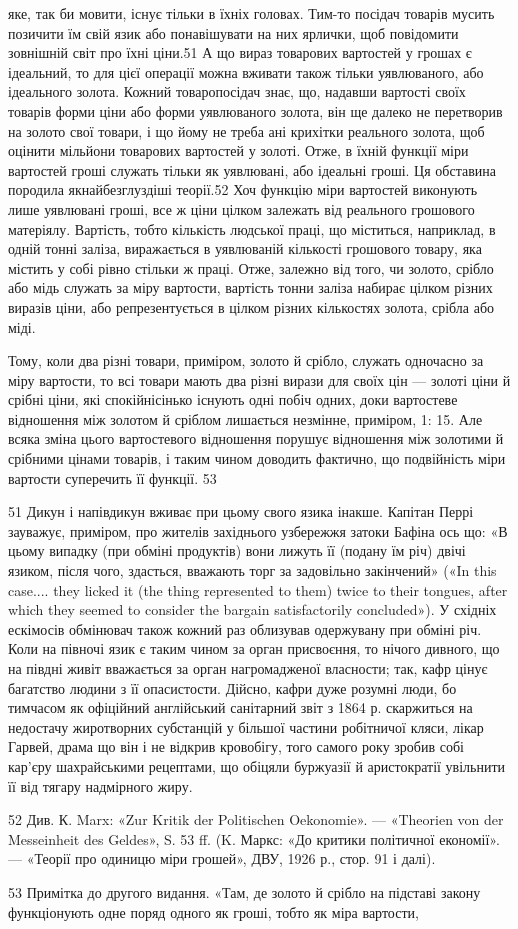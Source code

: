 яке, так би мовити, існує тільки в їхніх головах. Тим-то посідач
товарів мусить позичити їм свій язик або понавішувати на них
ярлички, щоб повідомити зовнішній світ про їхні ціни.51 А що
вираз товарових вартостей у грошах є ідеальний, то для цієї
операції можна вживати також тільки уявлюваного, або ідеального
золота. Кожний товаропосідач знає, що, надавши вартості
своїх товарів форми ціни або форми уявлюваного золота, він
ще далеко не перетворив на золото свої товари, і що йому не
треба ані крихітки реального золота, щоб оцінити мільйони
товарових вартостей у золоті. Отже, в їхній функції міри вартостей
гроші служать тільки як уявлювані, або ідеальні гроші.
Ця обставина породила якнайбезглуздіші теорії.52 Хоч функцію
міри вартостей виконують лише уявлювані гроші, все ж ціни
цілком залежать від реального грошового матеріялу. Вартість,
тобто кількість людської праці, що міститься, наприклад, в
одній тонні заліза, виражається в уявлюваній кількості грошового
товару, яка містить у собі рівно стільки ж праці. Отже,
залежно від того, чи золото, срібло або мідь служать за міру
вартости, вартість тонни заліза набирає цілком різних виразів
ціни, або репрезентується в цілком різних кількостях золота,
срібла або міді.

Тому, коли два різні товари, приміром, золото й срібло,
служать одночасно за міру вартости, то всі товари мають два
різні вирази для своїх цін — золоті ціни й срібні ціни, які спокійнісінько
існують одні побіч одних, доки вартостеве відношення
між золотом й сріблом лишається незмінне, приміром,
1: 15. Але всяка зміна цього вартостевого відношення порушує
відношення між золотими й срібними цінами товарів, і таким
чином доводить фактично, що подвійність міри вартости суперечить
її функції. 53

51 Дикун і напівдикун вживає при цьому свого язика інакше. Капітан
Перрі зауважує, приміром, про жителів західнього узбережжя затоки
Бафіна ось що: «В цьому випадку (при обміні продуктів) вони лижуть
її (подану їм річ) двічі язиком, після чого, здасться, вважають торг за задовільно
закінчений» («In this case.... they licked it (the thing represented
to them) twice to their tongues, after which they seemed to consider
the bargain satisfactorily concluded»). У східніх ескімосів обмінювач
також кожний раз облизував одержувану при обміні річ. Коли на півночі
язик є таким чином за орган присвоєння, то нічого дивного, що на
півдні живіт вважається за орган нагромадженої власности; так, кафр
цінує багатство людини з її опасистости. Дійсно, кафри дуже розумні
люди, бо тимчасом як офіційний англійський санітарний звіт з 1864 р.
скаржиться на недостачу жиротворних субстанцій у більшої частини робітничої
кляси, лікар Гарвей, драма що він і не відкрив кровобігу, того
самого року зробив собі кар’єру шахрайськими рецептами, що обіцяли
буржуазії й аристократії увільнити її від тягару надмірного жиру.

52 Див. К. Marx: «Zur Kritik der Politischen Oekonomie». — «Theorien
von der Messeinheit des Geldes», S. 53 ff. (K. Маркс: «До критики
політичної економії». — «Теорії про одиницю міри грошей», ДВУ, 1926 р.,
стор. 91 і далі).

53 Примітка до другого видання. «Там, де золото й срібло на підставі
закону функціонують одне поряд одного як гроші, тобто як міра вартости,
